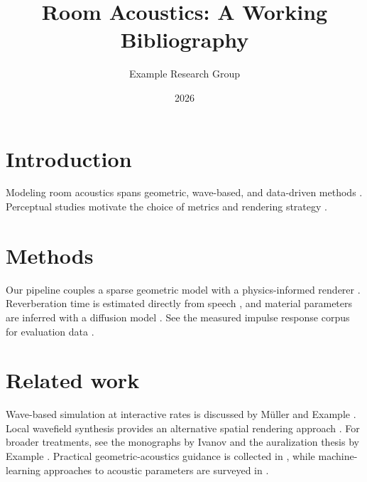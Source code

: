 \documentclass{article}
\title{Room Acoustics: A Working Bibliography}
\author{Example Research Group}
\date{2026}
\begin{document}
\maketitle

\section{Introduction}
Modeling room acoustics spans geometric, wave-based, and data-driven methods
\cite{gauss2026,muller2025,zhao2025}. Perceptual studies motivate the choice of
metrics and rendering strategy \cite{alvarez2024,okafor2016}.

\section{Methods}
Our pipeline couples a sparse geometric model \cite{zhao2025} with a
physics-informed renderer \cite{gauss2026,gauss2026}. Reverberation time is
estimated directly from speech \cite{nasser2023}, and material parameters are
inferred with a diffusion model \cite{laurent2024}. See the measured impulse
response corpus for evaluation data \cite{park2022}.

\section{Related work}
Wave-based simulation at interactive rates is discussed by Müller and Example
\cite{muller2025}. Local wavefield synthesis provides an alternative spatial
rendering approach \cite{okafor2023}. For broader treatments, see the monographs
by Ivanov \cite{ivanov2022} and the auralization thesis by Example
\cite{example2021}. Practical geometric-acoustics guidance is collected in
\cite{muller2020}, while machine-learning approaches to acoustic parameters are
surveyed in \cite{chen2020}.



\end{document}
